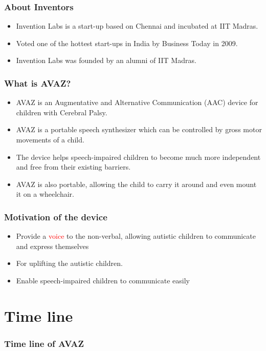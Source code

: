 \documentclass[12pt]{beamer}
\begin{document}
\begin{frame}
	\frametitle{About Inventors}
	\begin{itemize}
		\item Invention Labs is a start-up based on Chennai and incubated at IIT Madras.
		\item Voted one of the hottest start-ups in India by Business Today in 2009.
		\item Invention Labs was founded by an alumni of IIT Madras.
	\end{itemize}
\end{frame}

\begin{frame}
	\frametitle{What is AVAZ?}
	\begin{itemize}
		\item AVAZ is an Augmentative and Alternative Communication (AAC) device for children with Cerebral Palsy.
		\item AVAZ is a portable speech synthesizer which can be controlled by gross motor movements of a child.
		\item The device helps speech-impaired children to become much more independent and free from their existing barriers.
		\item AVAZ is also portable, allowing the child to carry it around and even mount it on a wheelchair.
	\end{itemize}
\end{frame}

\begin{frame}
	\frametitle {Motivation of the device}
	\begin{itemize}
		\item Provide a \textcolor{red}{voice} to the non-verbal, allowing autistic children to communicate and express themselves
		\item For uplifting the autistic children.
		\item Enable speech-impaired children to communicate easily 
	\end{itemize}
\end{frame}

\section{Time line}
\begin{frame}
	\frametitle{Time line of AVAZ}
\end{frame}
\end{document}
